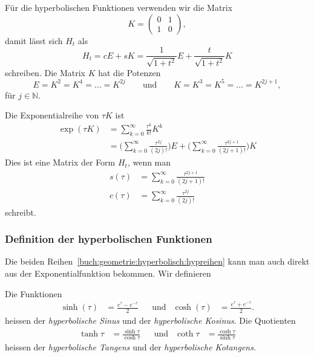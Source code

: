 Für die hyperbolischen Funktionen verwenden wir die Matrix
\begin{equation}
K
=
\begin{pmatrix}
0&1\\
1&0
\end{pmatrix},
\label{buch:geometrie:hyperbolisch:matrixK}
\end{equation}
damit lässt sich $H_t$ als
\[
H_t
=
c E + s K
=
\frac{1}{\sqrt{1+t^2}} E + \frac{t}{\sqrt{1+t^2}} K
\]
schreiben.
Die Matrix $K$ hat die Potenzen
\[
E
=
K^2 =  K^4 = \dots = K^{2j}
\qquad\text{und}\qquad
K
= K^3 = K^5 = \dots = K^{2j+1},
\]
für $j\in\mathbb{N}$.

Die Exponentialreihe von $\tau K$ ist
\begin{align*}
\exp(\tau K)
&=
\sum_{k=0}^\infty \frac{\tau^k}{k!} K^k
\\
&=
\biggl(
\sum_{k=0}^\infty \frac{\tau^{2j}}{(2j)!}
\biggr)
E
+
\biggl(
\sum_{k=0}^\infty \frac{\tau^{2j+1}}{(2j+1)!}
\biggr)
K
\end{align*}
Dies ist eine Matrix der Form $H_t$, wenn man
\begin{equation}
\begin{aligned}
s(\tau)&=
\sum_{k=0}^\infty \frac{\tau^{2j+1}}{(2j+1)!}
\\
c(\tau)&=
\sum_{k=0}^\infty \frac{\tau^{2j}}{(2j)!}
\end{aligned}
\label{buch:geometrie:hyperbolisch:hypreihen}
\end{equation}
schreibt.

\subsubsection{Definition der hyperbolischen Funktionen}
Die beiden Reihen~\eqref{buch:geometrie:hyperbolisch:hypreihen}
kann man auch direkt aus der Exponentialfunktion bekommen.
Wir definieren

\begin{definition}
\label{buch:geometrie:hyperbolisch:def}
Die Funktionen
\[
\begin{aligned}
\sinh(\tau)&=\frac{e^\tau-e^{-\tau}}2
&&\text{und}&
\cosh(\tau)&=\frac{e^\tau+e^{-\tau}}2.
\end{aligned}
\]
heissen der {\em hyperbolische Sinus} und der {\em hyperbolische Kosinus}.
Die Quotienten
\[
\begin{aligned}
\tanh\tau &= \frac{\sinh \tau}{\cosh \tau}
&&\text{und}&
\coth\tau &= \frac{\cosh \tau}{\sinh \tau}
\end{aligned}
\]
heissen der {\em hyperbolische Tangens} und der {\em hyperbolische Kotangens}.
\end{definition}

